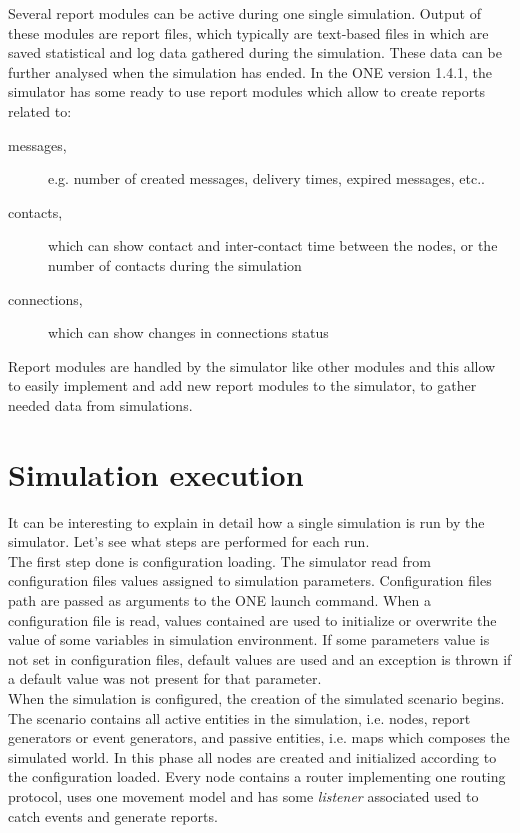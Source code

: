 Several report modules can be active during one single simulation. Output of these modules are report files, which typically are text-based files in which are saved statistical and log data gathered during the simulation. These data can be further analysed when the simulation has ended. In the ONE version 1.4.1, the simulator has some ready to use report modules which allow to create reports related to:

\begin{description}
\item[messages,] e.g. number of created messages, delivery times, expired messages, etc..
\item[contacts,] which can show contact and inter-contact time between the nodes, or the number of contacts during the simulation
\item[connections,] which can show changes in connections status
\end{description}

Report modules are handled by the simulator like other modules and this allow to easily implement and add new report modules to the simulator, to gather needed data from simulations.


\section{Simulation execution}
\label{esecuzioneONE}
It can be interesting to explain in detail how a single simulation is run by the simulator. Let's see what steps are performed for each run.
\\

The first step done is configuration loading. The simulator read from configuration files values assigned to simulation parameters. Configuration files path are passed as arguments to the ONE launch command. When a configuration file is read, values contained are used to initialize or overwrite the value of some variables in simulation environment. If some parameters value is not set in configuration files, default values are used and an exception is thrown if a default value was not present for that parameter.
\\

When the simulation is configured, the creation of the simulated scenario begins. The scenario contains all active entities in the simulation, i.e. nodes, report generators or event generators, and passive entities, i.e. maps which composes the simulated world. In this phase all nodes are created and initialized according to the configuration loaded. Every node contains a router implementing one routing protocol, uses one movement model and has some \textit{listener} associated used to catch events and generate reports.
\\

